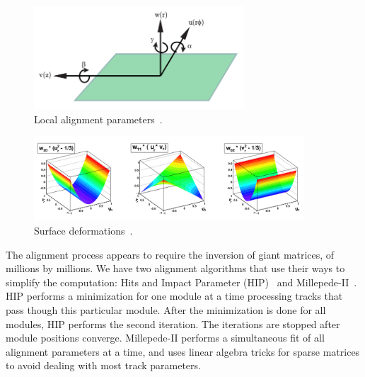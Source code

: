 

\begin{figure}[htb]
    \begin{center}
        \includegraphics[width=0.70\textwidth]{../figs/Alignment/alignment_strip_coords.png}
    \end{center}
    \caption{Local alignment parameters~\cite{ref_Frank_thesis}.}
    \label{fig:alignmentParameters}
\end{figure}

\begin{figure}[htb]
    \begin{center}
        \includegraphics[width=0.90\textwidth]{../figs/Alignment/alignment_surface_deformations.png}
    \end{center}
    \caption{Surface deformations~\cite{ref_Alignment}.}
    \label{fig:surfaceDeformations}
\end{figure}

The alignment process appears to require the inversion of giant matrices, of millions by millions. We have two alignment algorithms that use their ways to simplify the computation: Hits and Impact Parameter (HIP)~\cite{ref_HIP_Alg} and Millepede-II~\cite{ref_MPII_Alg}. HIP performs a minimization for one module at a time processing tracks that pass though this particular module. After the minimization is done for all modules, HIP performs the second iteration. The iterations are stopped after module positions converge. Millepede-II performs a simultaneous fit of all alignment parameters at a time, and uses linear algebra tricks for sparse matrices to avoid dealing with most track parameters.

